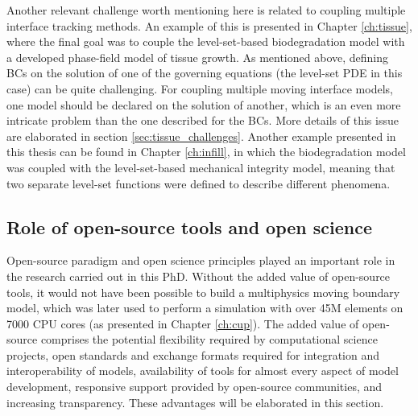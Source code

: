 Another relevant challenge worth mentioning here is related to coupling multiple interface tracking methods. An example of this is presented in Chapter \ref{ch:tissue}, where the final goal was to couple the level-set-based biodegradation model with a developed phase-field model of tissue growth. As mentioned above, defining BCs on the solution of one of the governing equations (the level-set \gls{PDE} in this case) can be quite challenging. For coupling multiple moving interface models, one model should be declared on the solution of another, which is an even more intricate problem than the one described for the BCs. More details of this issue are elaborated in section \ref{sec:tissue_challenges}. Another example presented in this thesis can be found in Chapter \ref{ch:infill}, in which the biodegradation model was coupled with the level-set-based mechanical integrity model, meaning that two separate level-set functions were defined to describe different phenomena.


\subsection{Role of open-source tools and open science} \label{sec:open_source}

Open-source paradigm and open science principles played an important role in the research carried out in this PhD. Without the added value of open-source tools, it would not have been possible to build a multiphysics moving boundary model, which was later used to perform a simulation with over 45M elements on 7000 \gls{CPU} cores (as presented in Chapter \ref{ch:cup}). The added value of open-source comprises the potential flexibility required by computational science projects, open standards and exchange formats required for integration and interoperability of models, availability of tools for almost every aspect of model development, responsive support provided by open-source communities, and increasing transparency. These advantages will be elaborated in this section.

